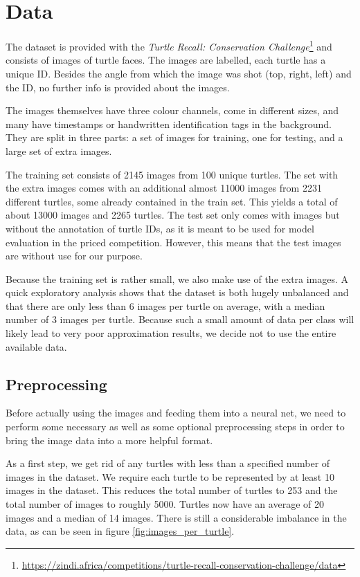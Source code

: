 \section{Data}
The dataset is provided with the \emph{Turtle Recall: Conservation Challenge}\footnote{\url{https://zindi.africa/competitions/turtle-recall-conservation-challenge/data}} and consists of images of turtle faces. The images are labelled, each turtle has a unique ID. Besides the angle from which the image was shot (top, right, left) and the ID, no further info is provided about the images.

The images themselves have three colour channels, come in different sizes, and many have timestamps or handwritten identification tags in the background. They are split in three parts: a set of images for training, one for testing, and a large set of extra images.

The training set consists of 2145 images from 100 unique turtles. The set with the extra images comes with an additional almost 11000 images from 2231 different turtles, some already contained in the train set. This yields a total of about 13000 images and 2265 turtles. The test set only comes with images but without the annotation of turtle IDs, as it is meant to be used for model evaluation in the priced competition. However, this means that the test images are without use for our purpose.

Because the training set is rather small, we also make use of the extra images. A quick exploratory analysis shows that the dataset is both hugely unbalanced and that there are only less than 6 images per turtle on average, with a median number of 3 images per turtle. Because such a small amount of data per class will likely lead to very poor approximation results, we decide not to use the entire available data.


\subsection{Preprocessing}
Before actually using the images and feeding them into a neural net, we need to perform some necessary as well as some optional preprocessing steps in order to bring the image data into a more helpful format.

As a first step, we get rid of any turtles with less than a specified number of images in the dataset. We require each turtle to be represented by at least 10 images in the dataset. This reduces the total number of turtles to 253 and the total number of images to roughly 5000. Turtles now have an average of 20 images and a median of 14 images. There is still a considerable imbalance in the data, as can be seen in figure \ref{fig:images_per_turtle}.


